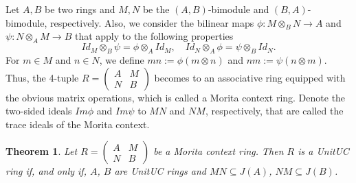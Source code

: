 \documentclass[12pt]{amsart}
\newtheorem{theorem}{Theorem}[section]
\theoremstyle{definition}
\begin{document}
Let $A, B$ be two rings and $M, N$ be the $(A, B)$-bimodule and $(B, A)$-bimodule, respectively. Also, we consider the bilinear maps $\phi : M\otimes_B N \to A$ and $\psi : N\otimes_AM \to B$ that apply to the following properties
$$Id_M \otimes_B \psi = \phi \otimes_A Id_M, \quad Id_N \otimes_A \phi = \psi \otimes_B Id_N .$$
For $m \in M$ and $n \in N$, we define $mn := \phi(m \otimes n)$ and $nm := \psi(n \otimes m)$.
Thus, the 4-tuple 
$R= \begin{pmatrix}
A & M \\
N & B
\end{pmatrix}$
becomes to an associative ring equipped with the obvious matrix operations, which is called a Morita context ring. Denote the two-sided
ideals $Im\phi$ and $Im\psi$ to $MN$ and $NM$, respectively, that are called the trace ideals of the Morita context.


\begin{theorem} \label{morita}
Let  $R= \begin{pmatrix}
A & M \\
N & B
\end{pmatrix}$
be a Morita context ring. Then $R$ is a   UnitUC ring if, and only if, $A$, $B$ are   UnitUC rings and $MN \subseteq J(A)$, $NM \subseteq J(B)$.
\end{theorem}
\end{document}
